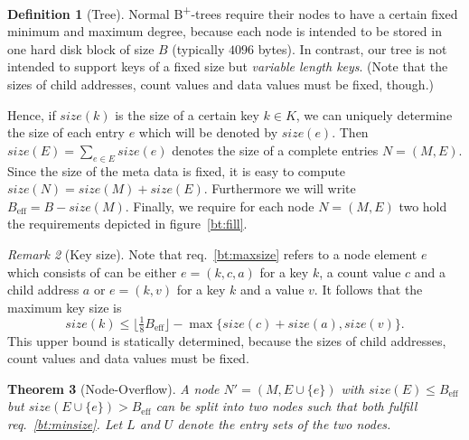 \documentclass[a4paper, 9pt]{scrartcl}
\theoremstyle{plain}
\newtheorem{thm}{Theorem}[section]
\theoremstyle{definition}
\newtheorem{defi}[thm]{Definition}
\theoremstyle{remark}
\newtheorem{rem}[thm]{Remark}
\newcommand{\Beff}{ B_{\text{eff}} }
\begin{document}
\begin{multicols}{2}
\begin{defi}[Tree]
Normal B\textsuperscript{+}-trees require their nodes to have a certain fixed
minimum and maximum degree, because each node is intended to be stored in one
hard disk block of size $B$ (typically $4096$ bytes).
In contrast, our tree is not intended to support keys of a fixed size
but {\em variable length keys}.
(Note that the sizes of child addresses, count values and data values must be
fixed, though.)

Hence, if $size(k)$ is the size of a certain key $k \in K$, we can uniquely
determine the size of each entry $e$ which will be denoted by $size(e)$.
Then \mbox{$size(E) = \sum_{e \in E} size(e)$} denotes the size of a complete
entries \mbox{$N = (M, E)$}.
Since the size of the meta data is fixed, it is easy to compute 
\mbox{$size(N) = size(M) + size(E)$}.
Furthermore we will write \mbox{$\Beff = B - size(M)$}.
Finally, we require for each node \mbox{$N = (M, E)$} two hold the requirements
depicted in figure~\ref{bt:fill}.
\end{defi}


\begin{rem}[Key size]
Note that req.~\ref{bt:maxsize} refers to a node element $e$ which consists
of can be either \mbox{$e = (k, c, a)$} for a key $k$, a count value $c$ and
a child address $a$ or \mbox{$e = (k, v)$} for a key $k$ and a value $v$.
It follows that the maximum key size is
\[ size(k) \leq \lfloor \tfrac{1}{8} \Beff \rfloor
		- \max \{ size(c) + size(a), size(v) \}. \]
This upper bound is statically determined, because the sizes of child addresses,
count values and data values must be fixed.
\end{rem}


\ifx \nothingblabla
\begin{thm}[Node-Overflow]
A node \mbox{$N' = (M, E \cup \{ e \})$} with \mbox{$size(E) \leq \Beff$} but
\mbox{$size(E \cup \{e\}) > \Beff$} can be split into two nodes such that both
fulfill req.~\ref{bt:minsize}. Let $L$ and $U$ denote the entry sets of the
two nodes.


\end{thm}
\end{multicols}
\end{document}

